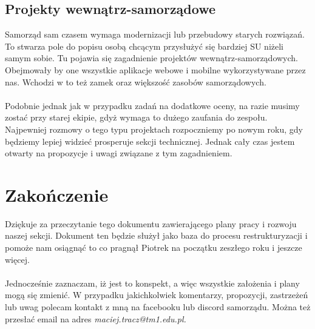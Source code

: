 \documentclass[9pt,a4paper]{report}
\begin{document}
\section{Projekty wewnątrz-samorządowe} 

Samorząd sam czasem wymaga modernizacji lub przebudowy starych rozwiązań. To stwarza pole do popisu osobą chcącym przysłużyć się bardziej SU niżeli samym sobie. Tu pojawia się zagadnienie projektów wewnątrz-samorządowych. Obejmowały by one wszystkie aplikacje webowe i mobilne wykorzystywane przez nas. Wchodzi w to też zamek oraz większość zasobów samorządowych.\\\\ 

Podobnie jednak jak w przypadku zadań na dodatkowe oceny, na razie musimy zostać przy starej ekipie, gdyż wymaga to dużego zaufania do zespołu. Najpewniej rozmowy o tego typu projektach rozpoczniemy po nowym roku, gdy będziemy lepiej widzieć prosperuje sekcji technicznej. Jednak cały czas jestem otwarty na propozycje i uwagi związane z tym zagadnieniem.

\chapter{Zakończenie} 

Dziękuje za przeczytanie tego dokumentu zawierającego plany pracy i rozwoju naszej sekcji. Dokument ten będzie służył jako baza do procesu restrukturyzacji i pomoże nam osiągnąć to co pragnął Piotrek na początku zeszłego roku i jeszcze więcej.\\\\ 

Jednocześnie zaznaczam, iż jest to konspekt, a więc wszystkie założenia i plany mogą się zmienić. W przypadku jakichkolwiek komentarzy, propozycji, zastrzeżeń lub uwag polecam kontakt z mną na facebooku lub discord samorządu. Można też przesłać email na adres \textit{maciej.tracz@tm1.edu.pl. }\\\\ 
\end{document}
